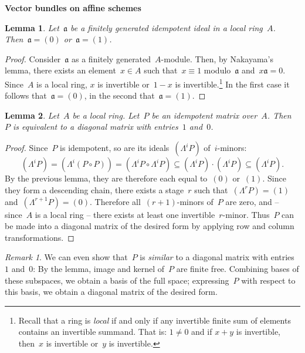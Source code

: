 \documentclass[12pt]{scrartcl}
\theoremstyle{definition}
\theoremstyle{plain}
\newtheorem*{lemma}{Lemma}
\theoremstyle{remark}
\newtheorem*{rem}{Remark}
\newcommand{\aaa}{\mathfrak{a}}
\begin{document}
\vspace*{-3.8em}
\enlargethispage{5em}

\begin{center}\huge\textbf{\textsf{Vector bundles on affine schemes}}\end{center}
\bigskip

\begin{lemma}Let~$\aaa$ be a finitely generated
idempotent ideal in a local ring~$A$. Then~$\aaa = (0)$ or~$\aaa = (1)$.
\end{lemma}

\begin{proof}Consider~$\aaa$ as a finitely generated~$A$-module. Then, by
Nakayama's lemma, there exists an element~$x \in A$ such that~$x \equiv 1$
modulo~$\aaa$ and~$x \aaa = 0$. Since~$A$ is a local ring, $x$ is invertible
or~$1-x$ is invertible.\footnote{Recall that a ring is \emph{local} if and only
if any invertible finite sum of elements contains an invertible summand. That
is: $1 \neq 0$ and if $x + y$ is invertible, then~$x$ is invertible or~$y$ is
invertible.}
In the first case it follows that~$\aaa = (0)$, in the
second that~$\aaa = (1)$.
\end{proof}

\begin{lemma}Let~$A$ be a local ring. Let~$P$ be an idempotent matrix over~$A$.
Then~$P$ is equivalent to a diagonal matrix with entries~$1$ and~$0$.
\end{lemma}

\begin{proof}Since~$P$ is idempotent, so are its ideals~$(\Lambda^i P)$
of~$i$-minors:
\[ (\Lambda^i P) = (\Lambda^i (P \circ P)) =
(\Lambda^i P \circ \Lambda^i P) \subseteq (\Lambda^i P) \cdot (\Lambda^i P)
\subseteq (\Lambda^i P). \]
By the previous lemma, they are therefore each equal to~$(0)$ or~$(1)$. Since
they form a descending chain, there exists a stage~$r$ such that~$(\Lambda^r P)
= (1)$ and~$(\Lambda^{r+1} P) = (0)$. Therefore all~$(r+1)$-minors of~$P$ are
zero, and -- since~$A$ is a local ring -- there exists at least one
invertible~$r$-minor. Thus~$P$ can be made into a diagonal matrix of the
desired form by applying row and column transformations.
\end{proof}

\begin{rem}We can even show that~$P$ is \emph{similar} to a diagonal matrix
with entries~$1$ and~$0$: By the lemma, image and kernel of~$P$ are finite
free. Combining bases of these subspaces, we obtain a basis of the full space;
expressing~$P$ with respect to this basis, we obtain a diagonal matrix of the
desired form.\end{rem}
\end{document}
